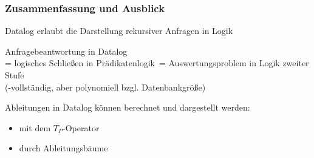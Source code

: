 \documentclass[aspectratio=1610,onlymath]{beamer}
\begin{document}
\begin{frame}\frametitle{Zusammenfassung und Ausblick}

Datalog erlaubt die Darstellung rekursiver Anfragen in Logik\bigskip

Anfragebeantwortung in Datalog\\
= logisches Schließen in Prädikatenlogik\
= Auswertungsproblem in Logik zweiter Stufe\\
(\ExpTime-vollständig, aber polynomiell bzgl. Datenbankgröße)\bigskip

Ableitungen in Datalog können berechnet und dargestellt werden:
\begin{itemize}
\item mit dem $T_P$-Operator
\item durch Ableitungsbäume
\end{itemize}\bigskip


\end{frame}


% 
% 
\end{document}
